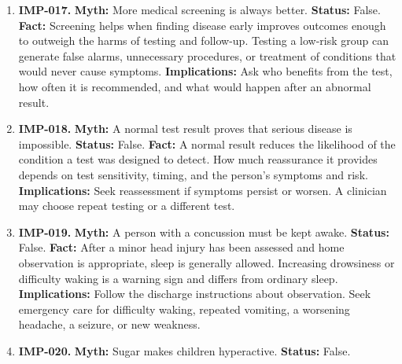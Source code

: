 \documentclass[11pt,oneside]{book}
\begin{document}
\begin{enumerate}[leftmargin=0pt,labelwidth=0pt,labelsep=0pt,itemindent=0pt]
\textbf{Implications:} If the person cannot cough effectively, speak, or breathe, have someone call emergency services immediately and begin age-appropriate choking first aid. Follow dispatcher instructions. If the person becomes unresponsive and is not breathing normally, start CPR.
\item[] \textbf{IMP-017.} \textbf{Myth:} More medical screening is always better.\newline
\textbf{Status:} False.\newline
\textbf{Fact:} Screening helps when finding disease early improves outcomes enough to outweigh the harms of testing and follow-up. Testing a low-risk group can generate false alarms, unnecessary procedures, or treatment of conditions that would never cause symptoms. \cite{ref185}\newline
\textbf{Implications:} Ask who benefits from the test, how often it is recommended, and what would happen after an abnormal result.
\item[] \textbf{IMP-018.} \textbf{Myth:} A normal test result proves that serious disease is impossible.\newline
\textbf{Status:} False.\newline
\textbf{Fact:} A normal result reduces the likelihood of the condition a test was designed to detect. How much reassurance it provides depends on test sensitivity, timing, and the person's symptoms and risk. \cite{ref310}\newline
\textbf{Implications:} Seek reassessment if symptoms persist or worsen. A clinician may choose repeat testing or a different test.
\item[] \textbf{IMP-019.} \textbf{Myth:} A person with a concussion must be kept awake.\newline
\textbf{Status:} False.\newline
\textbf{Fact:} After a minor head injury has been assessed and home observation is appropriate, sleep is generally allowed. Increasing drowsiness or difficulty waking is a warning sign and differs from ordinary sleep. \cite{ref405}\newline
\textbf{Implications:} Follow the discharge instructions about observation. Seek emergency care for difficulty waking, repeated vomiting, a worsening headache, a seizure, or new weakness.
\item[] \textbf{IMP-020.} \textbf{Myth:} Sugar makes children hyperactive.\newline
\textbf{Status:} False.\newline

\end{enumerate}
\end{document}
